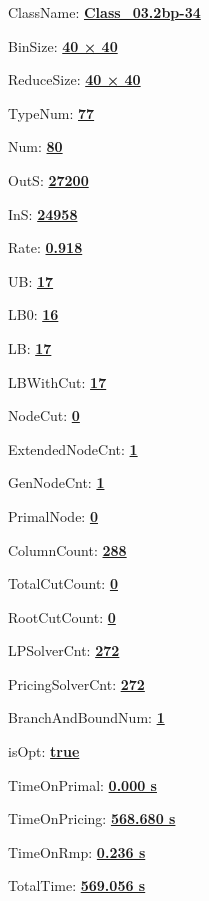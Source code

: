 \documentclass[11pt]{article}
\begin{document}
\pagestyle{empty}


ClassName: \underline{\textbf{Class_03.2bp-34}}
\par
BinSize: \underline{\textbf{40 × 40}}
\par
ReduceSize: \underline{\textbf{40 × 40}}
\par
TypeNum: \underline{\textbf{77}}
\par
Num: \underline{\textbf{80}}
\par
OutS: \underline{\textbf{27200}}
\par
InS: \underline{\textbf{24958}}
\par
Rate: \underline{\textbf{0.918}}
\par
UB: \underline{\textbf{17}}
\par
LB0: \underline{\textbf{16}}
\par
LB: \underline{\textbf{17}}
\par
LBWithCut: \underline{\textbf{17}}
\par
NodeCut: \underline{\textbf{0}}
\par
ExtendedNodeCnt: \underline{\textbf{1}}
\par
GenNodeCnt: \underline{\textbf{1}}
\par
PrimalNode: \underline{\textbf{0}}
\par
ColumnCount: \underline{\textbf{288}}
\par
TotalCutCount: \underline{\textbf{0}}
\par
RootCutCount: \underline{\textbf{0}}
\par
LPSolverCnt: \underline{\textbf{272}}
\par
PricingSolverCnt: \underline{\textbf{272}}
\par
BranchAndBoundNum: \underline{\textbf{1}}
\par
isOpt: \underline{\textbf{true}}
\par
TimeOnPrimal: \underline{\textbf{0.000 s}}
\par
TimeOnPricing: \underline{\textbf{568.680 s}}
\par
TimeOnRmp: \underline{\textbf{0.236 s}}
\par
TotalTime: \underline{\textbf{569.056 s}}
\par
\newpage


\end{document}
